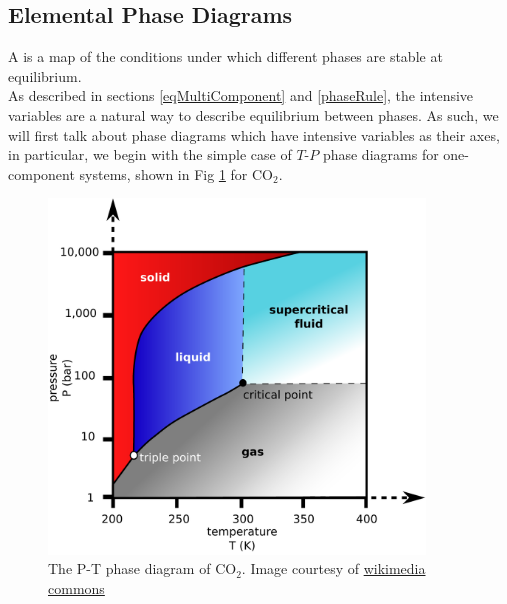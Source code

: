 \documentclass[12pt]{article}
\begin{document}
\subsection{Elemental Phase Diagrams} \label{elementalPhaseDiagrams}

A  is a map of the conditions under which different phases are stable at equilibrium.\\
As described in sections \ref{eqMultiComponent} and \ref{phaseRule}, the intensive variables are a natural way to describe equilibrium between phases. As such, we will first talk about phase diagrams which have intensive variables as their axes, in particular, we begin with the simple case of $T$-$P$ phase diagrams for one-component systems, shown in Fig \ref{phaseDiagramCO2} for $\text{CO}_2$. 
%   
\begin{figure}[h]
\centering
\includegraphics[width=10cm]{Carbon_dioxide_pressure_temperature_phase_diagram2.pdf}
\caption{The P-T phase diagram of $\text{CO}_2$. Image courtesy of \href{https://commons.wikimedia.org/wiki/File:Carbon_dioxide_pressure-temperature_phase_diagram.svg}{wikimedia commons}}%
\label{phaseDiagramCO2}
\end{figure}
\end{document}
